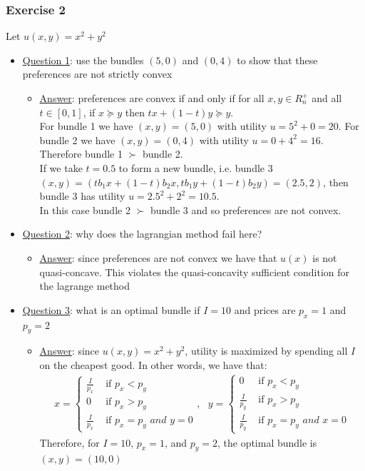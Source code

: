 \documentclass{article}
\begin{document}
\subsubsection{Exercise 2}
Let $u(x,y) = x^{2} + y^{2}$ \par \vspace{0.3em}
\begin{itemize}
  \item  \underline{Question 1}: use the bundles $(5,0)$ and $(0,4)$ to show that these preferences are not strictly convex
  \begin{itemize}
    \item  \underline{Answer}: preferences are convex if and only if for all $x,y \in R_{n}^{+}$ and all $t \in [0,1]$, if $x \succeq y$ then $tx + (1-t)y \succeq y$.\\ For bundle 1 we have $(x,y) = (5,0)$ with utility $u  = 5^{2} + 0 = 20$. For bundle 2 we have $(x,y) = (0,4)$ with utility $u = 0 + 4^{2} = 16$. Therefore bundle 1 $\succ$ bundle 2.\\ If we take $t=0.5$ to form a new bundle, i.e. bundle 3 $(x,y) = (tb_{1} x + (1-t)b_{2}x, tb_{1}y + (1-t)b_{2}y) = (2.5, 2)$, then bundle 3 has utility $u = 2.5^{2} + 2^{2} = 10.5$.\\ In this case bundle 2 $\succ$ bundle 3 and so preferences are not convex.
  \end{itemize}
  \item  \underline{Question 2}: why does the lagrangian method fail here?
  \begin{itemize}
    \item  \underline{Answer}: since preferences are not convex we have that $u(x)$ is not quasi-concave. This violates the quasi-concavity sufficient condition for the lagrange method
  \end{itemize}
  \item  \underline{Question 3}: what is an optimal bundle if $I=10$ and prices are $p_{x}=1$ and $p_{y} = 2$
  \begin{itemize}
    \item  \underline{Answer}: since $u(x, y) = x^{2} + y^{2}$, utility is maximized by spending all $I$ on the cheapest good. In other words, we have that:
    \begin{gather*}
      x =
      \begin{cases}
        \frac{I}{p_{x}} & \text{ if } p_{x}<p_{y} \\
        0 & \text{ if } p_{x} > p_{y} \\
        \frac{I}{p_{x}} &  \text{ if } p_{x} = p_{y} \textit{ and } y = 0
       \end{cases}
      , \ \ \
      y =
      \begin{cases}
        0 & \text{ if } p_{x}<p_{y} \\
        \frac{I}{p_{y}} & \text{ if } p_{x} > p_{y} \\
        \frac{I}{p_{y}} &  \text{ if } p_{x} = p_{y} \textit{ and } x = 0
       \end{cases}
    \end{gather*}
    Therefore, for $I=10$, $p_{x} = 1$, and $p_{y} = 2$, the optimal bundle is $(x, y) = (10, 0)$
  \end{itemize}
\end{itemize}
\end{document}
